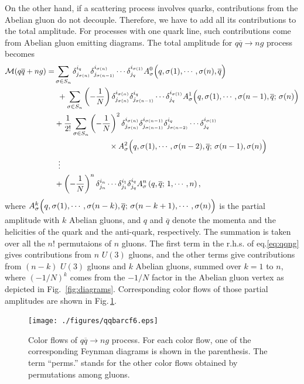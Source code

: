 \documentclass[a4paper,11pt]{article}
\begin{document}
On the other hand, if a scattering process involves quarks, contributions
from the Abelian gluon do not decouple. Therefore, we have to add all
its contributions to the total amplitude. For
processes with one quark line, such contributions come from Abelian gluon
emitting diagrams. The total
amplitude for $q\overline{q}\rightarrow ng$ process becomes
\begin{align}
{\cal M}(q\overline{q}+ng)=&\sum_{\sigma\in S_n}\delta^{i_q}_{j_{\sigma(n)}}
\delta^{i_{\sigma(n)}}_{j_{\sigma(n-1)}}\cdots\delta^{i_{\sigma(1)}}_{j_q}
A^0_{\sigma}\Bigl(q,\sigma(1),\cdots,\sigma(n),\overline{q}\Bigr)\nonumber\\
&\hspace{0.4em}+\sum_{\sigma\in S_n}\left(-\frac{1}{N}\right)\delta^{i_{\sigma(n)}}_{j_{\sigma(n)}}\delta^{i_q}_{j_{\sigma(n-1)}}
\cdots\delta^{i_{\sigma(1)}}_{j_q}A^1_{\sigma}\Bigl(q,\sigma(1),\cdots,\sigma(n-1),\overline{q};\,\sigma(n)\Bigr)\nonumber\\
&+\frac{1}{2!}\sum_{\sigma\in
 S_n}\left(-\frac{1}{N}\right)^2\delta^{i_{\sigma(n)}}_{j_{\sigma(n)}}\delta^{i_{\sigma(n-1)}}_{j_{\sigma(n-1)}}
 \delta^{i_q}_{j_{\sigma(n-2)}}\cdots\delta^{i_{\sigma(1)}}_{j_q}\nonumber\\
&\hspace{7em}\times A^2_{\sigma}\Bigl(q,\sigma(1),\cdots,\sigma(n-2),\overline{q};\,\sigma(n-1),\sigma(n)\Bigr)\nonumber\\
&\hspace{0.5em}\vdots\nonumber\\
&+\left(-\frac{1}{N}\right)^n\delta^{i_n}_{j_n}\cdots\delta^{i_1}_{j_1}\delta^{i_q}_{j_q}
A^n_{\sigma}\left(q,\overline{q};\,1,\cdots,n\right),
\label{eq:qqng}
\end{align}
where
$A^k_{\sigma}\Bigl(q,\sigma(1),\cdots,\sigma(n-k),\overline{q};\,\sigma(n-k+1),\cdots,\sigma(n)\Bigr)$
is the partial amplitude with $k$ Abelian gluons, and $q$ and
$\overline{q}$ denote the momenta and the helicities of the quark and the anti-quark,
respectively. The summation is taken over all the $n!$ permutaions of $n$ gluons. The
first term in the r.h.s. of eq.\eqref{eq:qqng} gives contributions from
$n$ $U(3)$ gluons, and the other terms give contributions from
$(n-k)$ $U(3)$ gluons and $k$ Abelian gluons, summed over $k=1$ to
$n$, where $(-1/N)^k$ comes from the $-1/N$ factor in the Abelian gluon vertex as depicted in Fig.~\ref{fig:diagrams}. Corresponding color flows of those partial amplitudes are shown in Fig.\,\ref{fig:qqbarcf}.
\begin{figure}
\begin{center}
\texttt{[image: ./figures/qqbarcf6.eps]}
\caption{Color flows of $q\overline{q}\rightarrow ng$ process. For each
 color flow, one of the corresponding Feynman diagrams is shown in the parenthesis. The
 term ``perms.'' stands for the other color flows obtained by permutations among gluons.}
\label{fig:qqbarcf}
\end{center}
\end{figure}
\end{document}
